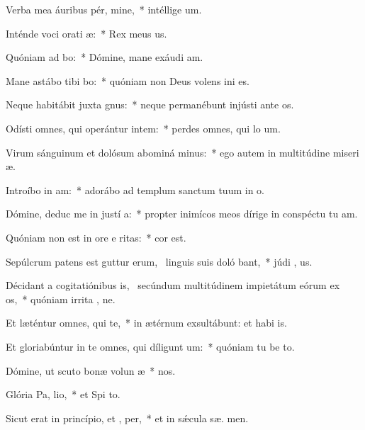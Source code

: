 \item Verba mea áuribus pér, mine,~* intéllige  um.
\item Inténde voci orati æ:~* Rex meus   us.
\item Quóniam ad  bo:~* Dómine, mane exáudi  am.
\item Mane astábo tibi  bo:~* quóniam non Deus volens ini  es.
\item Neque habitábit juxta  gnus:~* neque permanébunt injústi ante  os.
\item Odísti omnes, qui operántur intem:~* perdes omnes, qui lo um.
\item Virum sánguinum et dolósum abominá minus:~* ego autem in multitúdine miseri æ.
\item Introíbo in  am:~* adorábo ad templum sanctum tuum in  o.
\item Dómine, deduc me in justí a:~* propter inimícos meos dírige in conspéctu tu  am.
\item Quóniam non est in ore e ritas:~* cor   est.
\item Sepúlcrum patens est guttur erum,~\pscross{} linguis suis doló bant,~* júdi , us.
\item Décidant a cogitatiónibus is,~\pscross{} secúndum multitúdinem impietátum eórum ex os,~* quóniam irrita , ne.
\item Et læténtur omnes, qui   te,~* in ætérnum exsultábunt: et habi  is.
\item Et gloriabúntur in te omnes, qui díligunt  um:~* quóniam tu be to.
\item Dómine, ut scuto bonæ volun æ~*  nos.
\item Glória Pa,  lio,~* et Spi to.
\item Sicut erat in princípio, et ,  per,~* et in sǽcula sæ. men.
